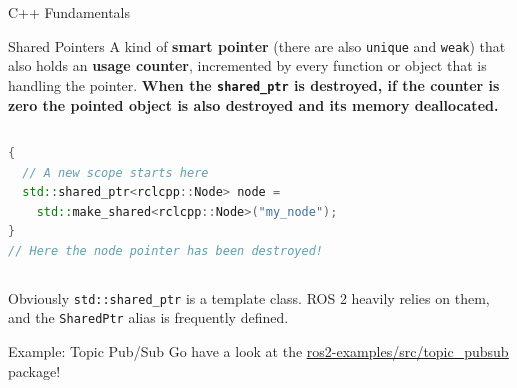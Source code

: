 \begin{frame}[fragile]{C++ Fundamentals}
\begin{block}{Shared Pointers}
A kind of \textbf{smart pointer} (there are also \texttt{unique} and \texttt{weak}) that also holds an \textbf{usage counter}, incremented by every function or object that is handling the pointer. \textbf{When the \texttt{shared\_ptr} is destroyed, if the counter is zero the pointed object is also destroyed and its memory deallocated.}

\begin{columns}
\begin{lstlisting}[language=C++, caption=Example of shared pointer creation]
{
  // A new scope starts here
  std::shared_ptr<rclcpp::Node> node =
    std::make_shared<rclcpp::Node>("my_node");
}
// Here the node pointer has been destroyed!
\end{lstlisting}
\end{columns}

Obviously \texttt{std::shared\_ptr} is a template class. ROS 2 heavily relies on them, and the \texttt{SharedPtr} alias is frequently defined.
\end{block}
\end{frame}

\begin{frame}{Example: Topic Pub/Sub}
Go have a look at the \href{https://github.com/IntelligentSystemsLabUTV/ros2-examples/tree/galactic/src/topic_pubsub}{\color{blue}\underline{ros2-examples/src/topic\_pubsub}} package!
\end{frame}
